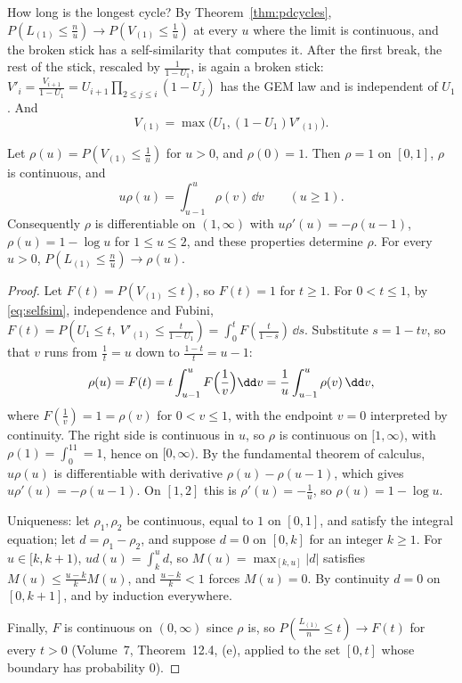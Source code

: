 How long is the longest cycle? By Theorem~\ref{thm:pdcycles}, $P(L_{(1)}\le\frac nu)\to P(V_{(1)}\le\frac1u)$ at every $u$ where the limit is continuous, and the broken stick has a self-similarity that computes it. After the first break, the rest of the stick, rescaled by $\frac1{1-U_1}$,
is again a broken stick: $V'_i=\frac{V_{i+1}}{1-U_1}=U_{i+1}\prod_{2\le j\le i}(1-U_j)$ has the GEM law and is independent of $U_1$. And
\begin{equation}\label{eq:selfsim}
V_{(1)}=\max\bigl(U_1,(1-U_1)V'_{(1)}\bigr).
\end{equation}

\begin{theorem}\label{thm:dickman}
Let $\rho(u)=P(V_{(1)}\le\frac1u)$ for $u>0$, and $\rho(0)=1$. Then $\rho=1$ on $[0,1]$, $\rho$ is continuous, and
\[
u\rho(u)=\int_{u-1}^u\rho(v)\,\dd v\qquad(u\ge1).
\]
Consequently $\rho$ is differentiable on $(1,\infty)$ with $u\rho'(u)=-\rho(u-1)$, $\rho(u)=1-\log u$ for $1\le u\le2$, and these properties determine $\rho$. For every $u>0$, $P(L_{(1)}\le\frac nu)\to\rho(u)$.
\end{theorem}
\begin{proof}
Let $F(t)=P(V_{(1)}\le t)$, so $F(t)=1$ for $t\ge1$. For $0<t\le1$, by \eqref{eq:selfsim}, independence and Fubini, $F(t)=P(U_1\le t,\ V'_{(1)}\le\frac t{1-U_1})=\int_0^tF(\frac t{1-s})\,\dd s$. Substitute $s=1-tv$, so that $v$ runs from $\frac1t=u$ down to
$\frac{1-t}t=u-1$:
\[
\rho(u)=F(t)=t\int_{u-1}^uF\Bigl(\frac1v\Bigr)\dd v=\frac1u\int_{u-1}^u\rho(v)\,\dd v,
\]
where $F(\frac1v)=1=\rho(v)$ for $0<v\le1$, with the endpoint $v=0$ interpreted by continuity. The right side is continuous in $u$, so $\rho$ is continuous on $[1,\infty)$, with $\rho(1)=\int_0^11=1$, hence on $[0,\infty)$. By the fundamental theorem of calculus, $u\rho(u)$ is differentiable with derivative
$\rho(u)-\rho(u-1)$, which gives $u\rho'(u)=-\rho(u-1)$. On $[1,2]$ this is $\rho'(u)=-\frac1u$, so $\rho(u)=1-\log u$.

Uniqueness: let $\rho_1,\rho_2$ be continuous, equal to $1$ on $[0,1]$, and satisfy the integral equation; let $d=\rho_1-\rho_2$, and suppose $d=0$ on $[0,k]$ for an integer $k\ge1$. For $u\in[k,k+1)$, $ud(u)=\int_k^ud$, so $M(u)=\max_{[k,u]}|d|$ satisfies $M(u)\le\frac{u-k}kM(u)$, and $\frac{u-k}k<1$ forces
$M(u)=0$. By continuity $d=0$ on $[0,k+1]$, and by induction everywhere.

Finally, $F$ is continuous on $(0,\infty)$ since $\rho$ is, so $P(\frac{L_{(1)}}n\le t)\to F(t)$ for every $t>0$ (Volume~7, Theorem~12.4, (e), applied to the set $[0,t]$ whose boundary has probability $0$).
\end{proof}

